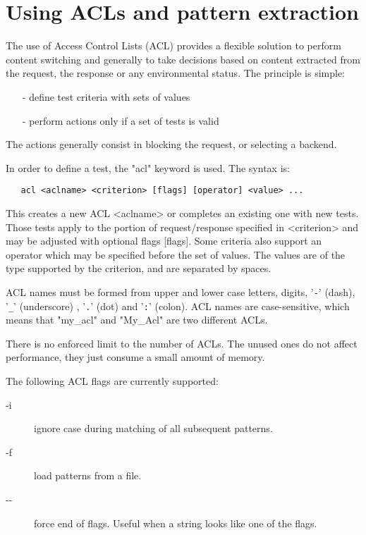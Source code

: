 \chapter{Using ACLs and pattern extraction}

The use of Access Control Lists (ACL) provides a flexible solution to perform
content switching and generally to take decisions based on content extracted
from the request, the response or any environmental status. The principle is
simple:

\begin{itemize}
\item[-] define test criteria with sets of values
\item[-] perform actions only if a set of tests is valid
\end{itemize}

The actions generally consist in blocking the request, or selecting a backend.

In order to define a test, the "acl" keyword is used. The syntax is:

\begin{verbatim}
   acl <aclname> <criterion> [flags] [operator] <value> ...
\end{verbatim}

This creates a new ACL <aclname> or completes an existing one with new tests.
Those tests apply to the portion of request/response specified in <criterion>
and may be adjusted with optional flags [flags]. Some criteria also support
an operator which may be specified before the set of values. The values are
of the type supported by the criterion, and are separated by spaces.

ACL names must be formed from upper and lower case letters, digits, '\verb|-|' (dash),
'\verb|_|' (underscore) , '\verb|.|' (dot) and '\verb|:|' (colon). ACL names are case-sensitive,
which means that "my\_acl" and "My\_Acl" are two different ACLs.

There is no enforced limit to the number of ACLs. The unused ones do not affect
performance, they just consume a small amount of memory.

The following ACL flags are currently supported:

\begin{description}
\item[-i] ignore case during matching of all subsequent patterns.
\item[-f] load patterns from a file.
\item[{-}{-}] force end of flags. Useful when a string looks like one of the flags.
\end{description}

